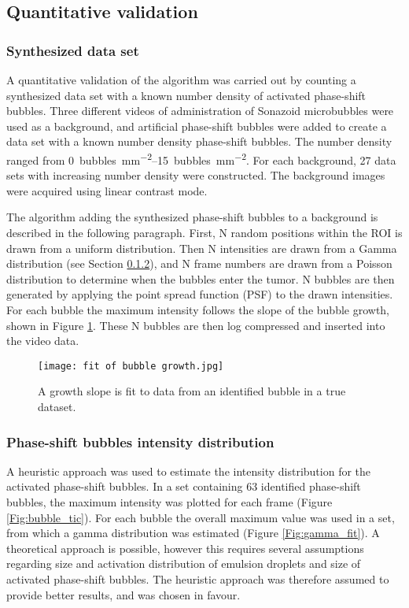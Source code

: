 \subsection{Quantitative validation}
\subsubsection{Synthesized data set}
A quantitative validation of the algorithm was carried out by counting a synthesized data set with a known number density of activated phase-shift bubbles. Three different videos of administration of Sonazoid\texttrademark{} microbubbles were used as a background, and artificial phase-shift bubbles were added to create a data set with a known number density phase-shift bubbles. The number density ranged from \SIrange[per-mode=symbol]{0}{15}{bubbles\per\milli\meter\squared}. For each background, 27 data sets with increasing number density were constructed. The background images were acquired using linear contrast mode.

The algorithm adding the synthesized phase-shift bubbles to a background is described in the following paragraph. First, N random positions within the ROI is drawn from a uniform distribution. Then N intensities are drawn from a Gamma distribution (see Section \ref{PS intensity distribution}), and N frame numbers are drawn from a Poisson distribution to determine when the bubbles enter the tumor. N bubbles are then generated by applying the point spread function (PSF) to the drawn intensities. For each bubble the maximum intensity follows the slope of the bubble growth, shown in Figure \ref{Fig:growth slope}. These N bubbles are then log compressed and inserted into the video data. 


\begin{figure}[h]
  \centering
  \texttt{[image: fit of bubble growth.jpg]}
  \caption{A growth slope is fit to data from an identified bubble in a true dataset.}
  \label{Fig:growth slope}
\end{figure}

\subsubsection{Phase-shift bubbles intensity distribution}
\label{PS intensity distribution}
A heuristic approach was used to estimate the intensity distribution for the activated phase-shift bubbles. In a set containing 63 identified phase-shift bubbles, the maximum intensity was plotted for each frame (Figure \ref{Fig:bubble_tic}). For each bubble the overall maximum value was used in a set, from which a gamma distribution was estimated (Figure \ref{Fig:gamma_fit}). A theoretical approach is possible, however this requires several assumptions regarding size and activation distribution of emulsion droplets and size of activated phase-shift bubbles.  The heuristic approach was therefore assumed to provide better results, and was chosen in favour. 


